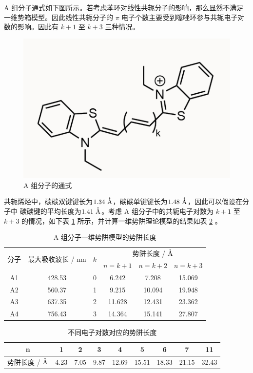 \documentclass[cn,hazy,pku,12pt,normal,math=newtx,cite=super]{elegantnote}
\begin{document}
A 组分子通式如下图所示。若考虑苯环对线性共轭分子的影响，那么显然不满足一维势箱模型。因此线性共轭分子的 $\pi$ 
电子个数主要受到噻唑环参与共轭电子对数的影响。因此有 $k+1$ 至 $k+3$ 三种情况。

\begin{figure}[htbp]
    \centering
    \includegraphics[width = .30\textwidth]{image/amol.png}
    \caption{A 组分子的通式}\label{16}
\end{figure}

共轭烯烃中，碳碳双键键长为$\rm 1.34\ \mathring{A} $，碳碳单键键长为$\rm 1.48\ \mathring{A} $，因此可以假设在分子中
碳碳键的平均长度为$\rm 1.41\ \mathring{A}$。考虑 A 组分子中的共轭电子对数为 $k+1$ 至 $k+3$ 的情况，如下表 \ref{17} 所示，并计算一维势阱理论模型的结果如表 \ref{18} 。

\begin{table}[h]
    \centering
    \caption{A 组分子一维势阱模型的势阱长度}
    \label{17}
    \begin{tabular}{cccccc}
    \hline
    \multicolumn{1}{l}{\multirow{2}{*}{分子}} & \multicolumn{1}{l}{\multirow{2}{*}{最大吸收波长 / nm}} & \multicolumn{1}{l}{\multirow{2}{*}{$k$}} & \multicolumn{3}{c}{势阱长度 /$\rm \ \mathring{A} $} \\
    \multicolumn{1}{l}{}                    & \multicolumn{1}{l}{}                             & \multicolumn{1}{l}{}                   & $n=k+1$   & $n=k+2$  & $n=k+3$  \\ \hline
    A1 & 428.53 & 0 & 6.242  & 7.208  & 15.069 \\
    A2 & 560.37 & 1 & 9.215  & 10.094 & 19.948 \\
    A3 & 637.35 & 2 & 11.628 & 12.431 & 23.362 \\
    A4 & 756.43 & 3 & 14.364 & 15.141 & 27.807 \\ \hline
    \end{tabular}
\end{table}

\begin{table}[h]
    \centering
    \caption{不同电子对数对应的势阱长度}
    \label{18}
    \begin{tabular}{lcccccccc}
    \hline
    \multicolumn{1}{c}{n}       & 1    & 2    & 3    & 4     & 5     & 6     & 7   & 11  \\\hline
    势阱长度 /$\rm \ \mathring{A} $ & 4.23 & 7.05 & 9.87 & 12.69 & 15.51 & 18.33 & 21.15 & 32.43\\\hline
    \end{tabular}
\end{table}
\end{document}

